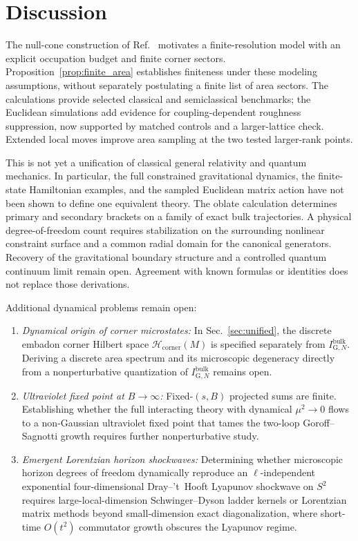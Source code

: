 \documentclass[onecolumn,11pt,aps,prd,amsmath,amssymb,nofootinbib,floatfix]{revtex4-2}
\newcommand{\calH}{\mathcal{H}}
\begin{document}
\section{Discussion}\label{sec:discussion}

The null-cone construction of Ref.~\cite{Chandrasekaran2026} motivates a finite-resolution model with an explicit occupation budget and finite corner sectors. Proposition~\ref{prop:finite_area} establishes finiteness under these modeling assumptions, without separately postulating a finite list of area sectors. The calculations provide selected classical and semiclassical benchmarks; the Euclidean simulations add evidence for coupling-dependent roughness suppression, now supported by matched controls and a larger-lattice check. Extended local moves improve area sampling at the two tested larger-rank points.

This is not yet a unification of classical general relativity and quantum mechanics. In particular, the full constrained gravitational dynamics, the finite-state Hamiltonian examples, and the sampled Euclidean matrix action have not been shown to define one equivalent theory. The oblate calculation determines primary and secondary brackets on a family of exact bulk trajectories. A physical degree-of-freedom count requires stabilization on the surrounding nonlinear constraint surface and a common radial domain for the canonical generators. Recovery of the gravitational boundary structure and a controlled quantum continuum limit remain open. Agreement with known formulas or identities does not replace those derivations.

Additional dynamical problems remain open:
\begin{enumerate}
\item \emph{Dynamical origin of corner microstates:} In Sec.~\ref{sec:unified}, the discrete embadon corner Hilbert space $\calH_{\mathrm{corner}}(M)$ is specified separately from $I_{\mathrm{G},N}^{\mathrm{bulk}}$. Deriving a discrete area spectrum and its microscopic degeneracy directly from a nonperturbative quantization of $I_{\mathrm{G},N}^{\mathrm{bulk}}$ remains open.
\item \emph{Ultraviolet fixed point at $B\to\infty$:} Fixed-$(s,B)$ projected sums are finite. Establishing whether the full interacting theory with dynamical $\mu^2\to 0$ flows to a non-Gaussian ultraviolet fixed point that tames the two-loop Goroff--Sagnotti growth requires further nonperturbative study.
\item \emph{Emergent Lorentzian horizon shockwaves:} Determining whether microscopic horizon degrees of freedom dynamically reproduce an $\ell$-independent exponential four-dimensional Dray--'t~Hooft Lyapunov shockwave on $S^2$ requires large-local-dimension Schwinger--Dyson ladder kernels or Lorentzian matrix methods beyond small-dimension exact diagonalization, where short-time $O(t^2)$ commutator growth obscures the Lyapunov regime.
\end{enumerate}
\end{document}
